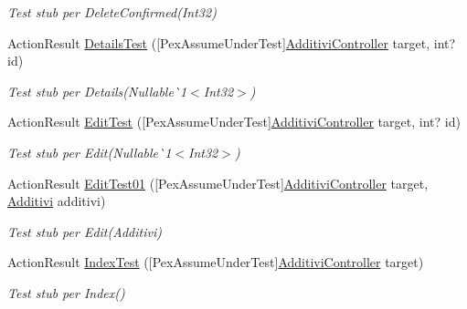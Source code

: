 \begin{DoxyCompactItemize}
\begin{DoxyCompactList}\small\item\em Test stub per Delete\+Confirmed(\+Int32)\end{DoxyCompactList}\item 
Action\+Result \mbox{\hyperlink{class_brew_day2_1_1_controllers_1_1_tests_1_1_additivi_controller_test_addb919cd3fdd282c5e7b8fd899318ae1}{Details\+Test}} (\mbox{[}Pex\+Assume\+Under\+Test\mbox{]}\mbox{\hyperlink{class_brew_day2_1_1_controllers_1_1_additivi_controller}{Additivi\+Controller}} target, int? id)
\begin{DoxyCompactList}\small\item\em Test stub per Details(Nullable\`{}1$<$Int32$>$)\end{DoxyCompactList}\item 
Action\+Result \mbox{\hyperlink{class_brew_day2_1_1_controllers_1_1_tests_1_1_additivi_controller_test_a29fb36e7b98ba86f82b0a73cb2982ca3}{Edit\+Test}} (\mbox{[}Pex\+Assume\+Under\+Test\mbox{]}\mbox{\hyperlink{class_brew_day2_1_1_controllers_1_1_additivi_controller}{Additivi\+Controller}} target, int? id)
\begin{DoxyCompactList}\small\item\em Test stub per Edit(Nullable\`{}1$<$Int32$>$)\end{DoxyCompactList}\item 
Action\+Result \mbox{\hyperlink{class_brew_day2_1_1_controllers_1_1_tests_1_1_additivi_controller_test_a253222d621d9c1bdc018e68110c01330}{Edit\+Test01}} (\mbox{[}Pex\+Assume\+Under\+Test\mbox{]}\mbox{\hyperlink{class_brew_day2_1_1_controllers_1_1_additivi_controller}{Additivi\+Controller}} target, \mbox{\hyperlink{class_brew_day2_1_1_models_1_1_additivi}{Additivi}} additivi)
\begin{DoxyCompactList}\small\item\em Test stub per Edit(\+Additivi)\end{DoxyCompactList}\item 
Action\+Result \mbox{\hyperlink{class_brew_day2_1_1_controllers_1_1_tests_1_1_additivi_controller_test_ae1aa64c7fd8fe8ff8c010ce818128a45}{Index\+Test}} (\mbox{[}Pex\+Assume\+Under\+Test\mbox{]}\mbox{\hyperlink{class_brew_day2_1_1_controllers_1_1_additivi_controller}{Additivi\+Controller}} target)
\begin{DoxyCompactList}\small\item\em Test stub per Index()\end{DoxyCompactList}\end{DoxyCompactItemize}


